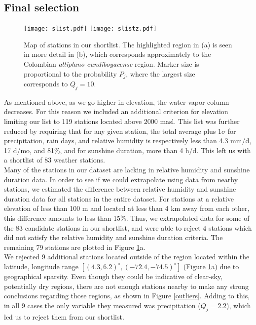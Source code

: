 \documentclass[12pt]{iopart}
\begin{document}
\subsection{Final selection}

\begin{figure}
\begin{center}
\texttt{[image: slist.pdf]}
\texttt{[image: slistz.pdf]}
\caption{Map of stations in our shortlist. The highlighted region in (a) is seen in more detail in (b), which corresponds approximately to the Colombian \emph{altiplano cundiboyacense} region. Marker size is proportional to the probability $P_j$, where the largest size corresponds to $Q_j=10$.}\label{shortlist}
\end{center}
\end{figure}

As mentioned above, as we go higher in elevation, the water vapor column decreases. For this reason we included an additional criterion for elevation limiting our list to 119 stations located above 2000 masl. This list was further reduced by requiring that for any given station, the total average plus 1$\sigma$ for precipitation, rain days, and relative humidity is respectively less than 4.3 mm/d, 17 d/mo, and 81\%, and for sunshine duration, more than 4 h/d. This left us with a shortlist of 83 weather stations.\\

Many of the stations in our dataset are lacking in relative humidity and sunshine duration data. In order to see if we could extrapolate using data from nearby stations, we estimated the difference between relative humidity and sunshine duration data for all stations in the entire dataset. For stations at a relative elevation of less than 100 m and located at less than 4 km away from each other, this difference amounts to less than 15\%. Thus, we extrapolated data for some of the 83 candidate stations in our shortlist, and were able to reject 4 stations which did not satisfy the relative humidity and sunshine duration criteria. The remaining 79 stations are plotted in Figure \ref{shortlist}a.\\

We rejected 9 additional stations located outside of the region located within the latitude, longitude range $[(4.3,6.2)^\circ,(-72.4,-74.5)^\circ]$ (Figure \ref{shortlist}a) due to geographical sparsity. Even though they could be indicative of clear-sky, potentially dry regions, there are not enough stations nearby to make any strong conclusions regarding those regions, as shown in Figure \ref{outliers}. Adding to this, in all 9 cases the only variable they measured was precipitation ($Q_j=2.2$), which led us to reject them from our shortlist. \\
\end{document}
